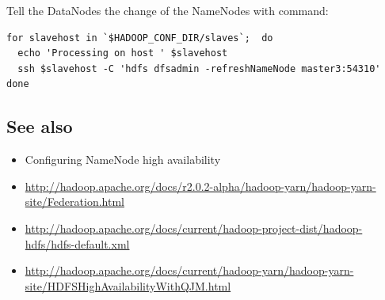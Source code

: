 Tell the DataNodes the change of the NameNodes with command:
\lstset{style=bashstyle}
\begin{lstlisting}
for slavehost in `$HADOOP_CONF_DIR/slaves`;  do
  echo 'Processing on host ' $slavehost
  ssh $slavehost -C 'hdfs dfsadmin -refreshNameNode master3:54310'
done
\end{lstlisting}

\subsection*{See also}
\begin{itemize}
  \item Configuring NameNode high availability
  \item \url{http://hadoop.apache.org/docs/r2.0.2-alpha/hadoop-yarn/hadoop-yarn-site/Federation.html}
  \item \url{http://hadoop.apache.org/docs/current/hadoop-project-dist/hadoop-hdfs/hdfs-default.xml}
  \item \url{http://hadoop.apache.org/docs/current/hadoop-yarn/hadoop-yarn-site/HDFSHighAvailabilityWithQJM.html}
\end{itemize}
